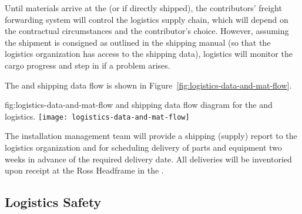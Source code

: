 Until materials arrive at the  (or  if directly shipped), the contributors' freight forwarding system will control the logistics supply chain, which will depend on the contractual circumstances and the contributor's choice. 
However, assuming the shipment is consigned as outlined in the  shipping manual (so that the %
logistics organization has access to the shipping data),  logistics will monitor the cargo progress and step in if a problem arises. 

The  and shipping data flow is shown in Figure~\ref{fig:logistics-data-and-mat-flow}.

 


\begin{dunefigure}{fig:logistics-data-and-mat-flow}
  { and shipping data flow diagram for the  and  logistics.}
 \texttt{[image: logistics-data-and-mat-flow]}
\end{dunefigure}

 
The  installation management team will provide a shipping (supply) report to the  logistics organization and  for scheduling delivery of parts and equipment two weeks in advance of the required delivery date. 
All %
deliveries will be inventoried upon receipt at the Ross Headframe in the . 




\subsection{Logistics Safety}
\label{sec:fdsp-tc-log-safety}

